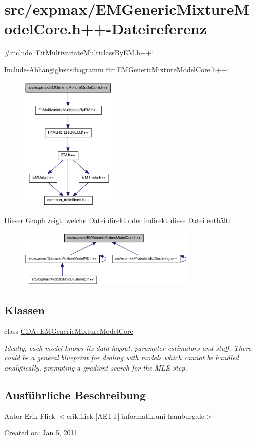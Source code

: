 \hypertarget{EMGenericMixtureModelCore_8h_09_09}{
\section{src/expmax/EMGenericMixtureModelCore.h++-\/Dateireferenz}
\label{EMGenericMixtureModelCore_8h_09_09}
}
{\ttfamily \#include \char`\"{}FitMultivariateMulticlassByEM.h++\char`\"{}}\par
Include-\/Abhängigkeitsdiagramm für EMGenericMixtureModelCore.h++:\nopagebreak
\begin{figure}[H]
\begin{center}
\leavevmode
\includegraphics[width=131pt]{EMGenericMixtureModelCore_8h_09_09__incl}
\end{center}
\end{figure}
Dieser Graph zeigt, welche Datei direkt oder indirekt diese Datei enthält:\nopagebreak
\begin{figure}[H]
\begin{center}
\leavevmode
\includegraphics[width=244pt]{EMGenericMixtureModelCore_8h_09_09__dep__incl}
\end{center}
\end{figure}
\subsection*{Klassen}
\begin{DoxyCompactItemize}
\item 
class \hyperlink{classCDA_1_1EMGenericMixtureModelCore}{CDA::EMGenericMixtureModelCore}
\begin{DoxyCompactList}\small\item\em Ideally, each model knows its data layout, parameter estimators and stuff. There could be a general blueprint for dealing with models which cannot be handled analytically, prompting a gradient search for the MLE step. \item\end{DoxyCompactList}\end{DoxyCompactItemize}


\subsection{Ausführliche Beschreibung}
\begin{DoxyAuthor}{Autor}
Erik Flick $<$erik.flick \mbox{[}AETT\mbox{]} informatik.uni-\/hamburg.de$>$
\end{DoxyAuthor}
Created on: Jan 5, 2011 